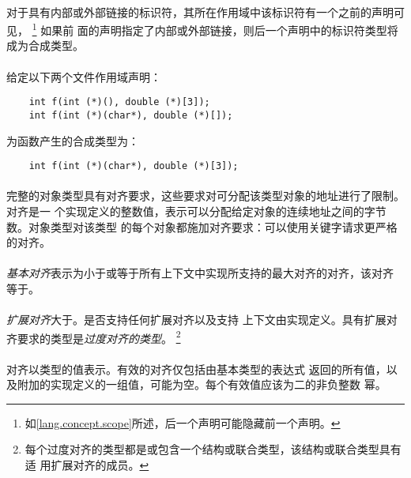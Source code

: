 {\paragraph{}
对于具有内部或外部链接的标识符，其所在作用域中该标识符有一个之前的声明可见，
\footnote{如\ref{lang.concept.scope}所述，后一个声明可能隐藏前一个声明。} 如果前
面的声明指定了内部或外部链接，则后一个声明中的标识符类型将成为合成类型。


\paragraph{}
\ex* 给定以下两个文件作用域声明：
\begin{lstlisting}
    int f(int (*)(), double (*)[3]);
    int f(int (*)(char*), double (*)[]);
\end{lstlisting}
为函数产生的合成类型为：
\begin{lstlisting}
    int f(int (*)(char*), double (*)[3]);
\end{lstlisting}

\paragraph{}
完整的对象类型具有对齐要求，这些要求对可分配该类型对象的地址进行了限制。对齐是一
个实现定义的整数值，表示可以分配给定对象的连续地址之间的字节数。对象类型对该类型
的每个对象都施加对齐要求：可以使用关键字请求更严格的对齐。

\paragraph{}
\textit{基本对齐}表示为小于或等于所有上下文中实现所支持的最大对齐的对齐，该对齐
等于。

\paragraph{}
\textit{扩展对齐}大于。是否支持任何扩展对齐以及支持
上下文由实现定义。具有扩展对齐要求的类型是\textit{过度对齐的类型}。
\footnote{每个过度对齐的类型都是或包含一个结构或联合类型，该结构或联合类型具有适
用扩展对齐的成员。}

\paragraph{}
对齐以类型的值表示。有效的对齐仅包括由基本类型的表达式
返回的所有值，以及附加的实现定义的一组值，可能为空。每个有效值应该为二的非负整数
幂。

}
